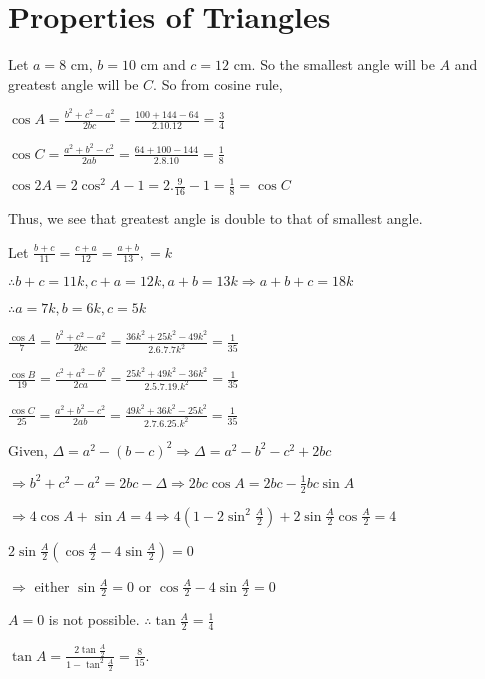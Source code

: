 \chapter{Properties of Triangles}
\startitemize[n, 1*broad]
\item Let $a = 8$ cm, $b = 10$ cm and $c = 12$ cm. So the smallest angle will be $A$ and greatest angle will
  be $C.$ So from cosine rule,

  $\cos A = \frac{b^2 + c^2 - a^2}{2bc} = \frac{100 + 144 - 64}{2.10.12} = \frac{3}{4}$

  $\cos C = \frac{a^2 + b^2 - c^2}{2ab} = \frac{64 + 100 - 144}{2.8.10} = \frac{1}{8}$

  $\cos 2A = 2\cos^2A - 1 = 2.\frac{9}{16} - 1 = \frac{1}{8} = \cos C$

  Thus, we see that greatest angle is double to that of smallest angle.

\item Let $\frac{b + c}{11} = \frac{c + a}{12} = \frac{a + b}{13}, = k$

  $\therefore b + c = 11k, c + a = 12k, a + b = 13k \Rightarrow a + b + c = 18k$

  $\therefore a = 7k, b = 6k, c = 5k$

  $\frac{\cos A}{7} = \frac{b^2 + c^2 - a^2}{2bc} = \frac{36k^2 + 25k^2 - 49k^2}{2.6.7.7k^2} = \frac{1}{35}$

  $\frac{\cos B}{19} = \frac{c^2 + a^2 - b^2}{2ca} = \frac{25k^2 + 49k^2 - 36k^2}{2.5.7.19.k^2} = \frac{1}{35}$

  $\frac{\cos C}{25} = \frac{a^2 + b^2 - c^2}{2ab} = \frac{49k^2 + 36k^2 - 25k^2}{2.7.6.25.k^2} = \frac{1}{35}$

\item Given, $\Delta = a^2 - (b - c)^2 \Rightarrow \Delta = a^2 - b^2 - c^2 + 2bc$

  $\Rightarrow b^2 + c ^2 - a^2 = 2bc - \Delta \Rightarrow 2bc\cos A = 2bc - \frac{1}{2}bc\sin A$

  $\Rightarrow 4\cos A + \sin A = 4 \Rightarrow 4\left(1 - 2\sin^2\frac{A}{2}\right) + 2\sin\frac{A}{2}\cos\frac{A}{2} = 4$

  $2\sin\frac{A}{2}\left(\cos\frac{A}{2} - 4\sin\frac{A}{2}\right) = 0$

  $\Rightarrow$ either $\sin\frac{A}{2} = 0$ or $\cos\frac{A}{2} - 4\sin\frac{A}{2} = 0$

  $A = 0$ is not possible. $\therefore \tan\frac{A}{2} = \frac{1}{4}$

  $\tan A = \frac{2\tan\frac{A}{2}}{1 - \tan^2\frac{A}{2}} = \frac{8}{15}.$

